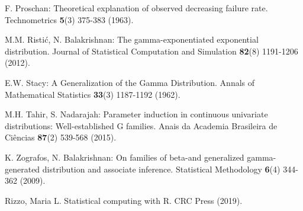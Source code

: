 \documentclass[12pt,a4paper]{article} %
\begin{document}
\begin{description}
\item
F. Proschan:
Theoretical explanation of observed decreasing failure rate.
Technometrics {\bf 5}(3) 375-383 (1963).

\item
M.M. Risti\'{c}, N. Balakrishnan:
The gamma-exponentiated exponential distribution.
Journal of Statistical Computation and Simulation {\bf 82}(8) 1191-1206 (2012).

\item
E.W. Stacy: A Generalization of the Gamma Distribution. Annals of Mathematical Statistics {\bf 33}(3) 1187-1192 (1962).

\item
M.H. Tahir, S. Nadarajah:
Parameter induction in continuous univariate distributions: Well-established G families.
Anais da Academia Brasileira de Ci\^{e}ncias {\bf 87}(2) 539-568 (2015).

\item
K. Zografos, N. Balakrishnan:
On families of beta-and generalized gamma-generated distribution and
associate inference.  Statistical Methodology {\bf 6}(4) 344-362 (2009).

\item
Rizzo, Maria L. Statistical computing with R. CRC Press (2019).

\end{description}
\end{document}

